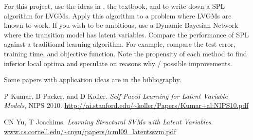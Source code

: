 \documentclass{article}
\begin{document}
For this project, use the ideas in \cite{SPL}, the textbook, and \cite{Murphy} to write down a SPL algorithm for LVGMs.  Apply this algorithm to a problem where LVGMs are known to work.  If you wish to be ambitious, use a Dynamic Bayesian Network where the transition model has latent variables.  Compare the performance of SPL against a traditional learning algorithm.  For example, compare the test error, training time, and objective function.  Note the propensity of each method to find inferior local optima and speculate on reasons why / possible improvements.

Some papers with application ideas are in the bibliography.



\begin{thebibliography}{9}


 P Kumar, B Packer, and D Koller. \emph{Self-Paced Learning for Latent Variable Models},
NIPS 2010. \url{http://ai.stanford.edu/~koller/Papers/Kumar+al:NIPS10.pdf}

 CN Yu, T Joachims. \emph{Learning Structural SVMs with Latent Variables}. \url{www.cs.cornell.edu/~cnyu/papers/icml09_latentssvm.pdf}


\end{thebibliography}
\end{document}
